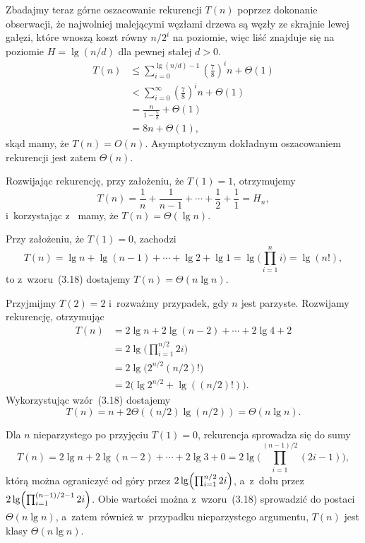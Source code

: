 Zbadajmy teraz górne oszacowanie rekurencji $T(n)$ poprzez dokonanie obserwacji, że najwolniej malejącymi węzłami drzewa są węzły ze skrajnie lewej gałęzi, które wnoszą koszt równy $n/2^i$ na  poziomie, więc liść znajduje się na poziomie $H=\lg(n/d)$ dla pewnej stałej $d>0$.
\begin{align*}
	T(n) &\le \sum_{i=0}^{\lg(n/d)-1}\left(\frac{7}{8}\right)^in+\Theta(1) \\
	&< \sum_{i=0}^\infty\left(\frac{7}{8}\right)^in+\Theta(1) \\
	&= \frac{n}{1-\frac{7}{8}}+\Theta(1) \\
	&= 8n+\Theta(1),
\end{align*}
skąd mamy, że $T(n)=O(n)$. Asymptotycznym dokładnym oszacowaniem rekurencji jest zatem $\Theta(n)$.

\subproblem %
Rozwijając rekurencję, przy założeniu, że $T(1)=1$, otrzymujemy
\[
	T(n) = \frac{1}{n}+\frac{1}{n-1}+\cdots+\frac{1}{2}+\frac{1}{1} = H_n,
\]
i~korzystając z~ mamy, że $T(n)=\Theta(\lg n)$.

\subproblem %
Przy założeniu, że $T(1)=0$, zachodzi
\[
	T(n) = \lg n+\lg(n-1)+\cdots+\lg2+\lg 1 = \lg\biggl(\prod_{i=1}^ni\biggr) = \lg(n!),
\]
to z~wzoru~(3.18) dostajemy $T(n)=\Theta(n\lg n)$.

\subproblem %
Przyjmijmy $T(2)=2$ i~rozważmy przypadek, gdy $n$ jest parzyste. Rozwijamy rekurencję, otrzymując
\begin{align*}
	T(n) &= 2\lg n+2\lg(n-2)+\cdots+2\lg4+2 \\
	&= 2\lg\biggl(\prod_{i=1}^{n/2}2i\biggr) \\
	&= 2\lg\bigl(2^{n/2}(n/2)!\bigr) \\
	&= 2\bigl(\lg 2^{n/2}+\lg((n/2)!)\bigr).
\end{align*}
Wykorzystując wzór~(3.18) dostajemy
\[
	T(n) = n+2\Theta((n/2)\lg (n/2)) = \Theta(n\lg n).
\]

Dla $n$ nieparzystego po przyjęciu $T(1)=0$, rekurencja sprowadza się do sumy
\[
    T(n) = 2\lg n+2\lg(n-2)+\cdots+2\lg3+0 = 2\lg\biggl(\prod_{i=1}^{(n-1)/2}(2i-1)\biggr),
\]
którą można ograniczyć od góry przez $2\lg\Bigl(\prod_{i=1}^{n/2}2i\Bigr)$, a~z~dołu przez $2\lg\Bigl(\prod_{i=1}^{(n-1)/2-1}2i\Bigr)$. Obie wartości można z~wzoru~(3.18) sprowadzić do postaci $\Theta(n\lg n)$, a~zatem również w~przypadku nieparzystego argumentu, $T(n)$ jest klasy $\Theta(n\lg n)$.

